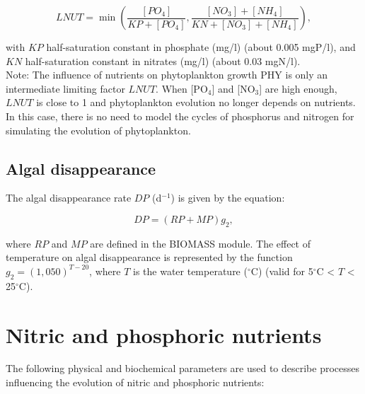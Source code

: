 \begin{equation}
  LNUT = \min \left( \frac{[PO_4]}{KP+[PO_4]}, \frac{[NO_3]+[NH_4]}{KN+[NO_3]+[NH_4]} \right),
\end{equation}

with $KP$ half-saturation constant in phosphate (mg/l) (about 0.005 mgP/l),
and $KN$ half-saturation constant in nitrates (mg/l) (about 0.03 mgN/l).\\

Note: The influence of nutrients on phytoplankton growth PHY is only an intermediate limiting factor $LNUT$.
When [PO$_4$] and [NO$_3$] are high enough, $LNUT$ is close to 1
and phytoplankton evolution no longer depends on nutrients.
In this case, there is no need to model the cycles of phosphorus and
nitrogen for simulating the evolution of phytoplankton.

\subsection{Algal disappearance}

The algal disappearance rate $DP$ (d$^{-1}$) is given by the equation:

\begin{equation}
  DP = (RP + MP) g_2,
\end{equation}

where $RP$ and $MP$ are defined in the BIOMASS module.
The effect of temperature on algal disappearance
is represented by the function $g_2 = (1,050)^{T-20}$,
where $T$ is the water temperature ($^{\circ}$C) (valid for 5$^{\circ}$C < $T$ < 25$^{\circ}$C).

\section{Nitric and phosphoric nutrients}

The following physical and biochemical parameters are used to describe processes
influencing the evolution of nitric and phosphoric nutrients:

